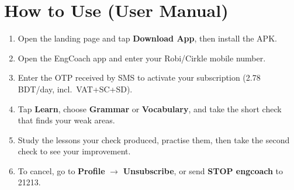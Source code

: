 \documentclass[11pt,a4paper]{article}
\begin{document}
\section{How to Use (User Manual)}
\begin{enumerate}
  \item Open the landing page and tap \textbf{Download App}, then install the APK.
  \item Open the EngCoach app and enter your Robi/Cirkle mobile number.
  \item Enter the OTP received by SMS to activate your subscription (2.78 BDT/day,
        incl.\ VAT+SC+SD).
  \item Tap \textbf{Learn}, choose \textbf{Grammar} or \textbf{Vocabulary}, and take the
        short check that finds your weak areas.
  \item Study the lessons your check produced, practise them, then take the second
        check to see your improvement.
  \item To cancel, go to \textbf{Profile} $\rightarrow$ \textbf{Unsubscribe}, or send
        \textbf{STOP engcoach} to 21213.
\end{enumerate}
\end{document}
